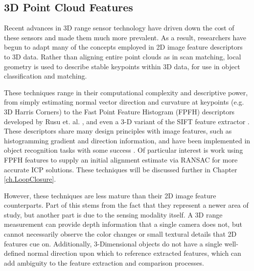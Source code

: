 \subsection{3D Point Cloud Features}

Recent advances in 3D range sensor technology have driven down the cost of these sensors and made them much more prevalent. As a result, researchers have begun to adapt many of the concepts employed in 2D image feature descriptors to 3D data. Rather than aligning entire point clouds as in scan matching, local geometry is used to describe stable keypoints within 3D data, for use in object classification and matching. 

These techniques range in their computational complexity and descriptive power, from simply estimating normal vector direction and curvature at keypoints (e.g. 3D Harris Corners) to the Fast Point Feature Histogram (FPFH) descriptors developed by Rusu et. al. \cite{Rusu2009}, and even a 3-D variant of the SIFT feature extractor \cite{Scovanner2007}. These descriptors share many design principles with image features, such as histogramming gradient and direction information, and have been implemented in object recognition tasks with some success \cite{Rusu2009}. Of particular interest is work using FPFH features to supply an initial alignment estimate via RANSAC for more accurate ICP solutions. These techniques will be discussed further in Chapter \ref{ch.LoopClosure}.

However, these techniques are less mature than their 2D image feature counterparts. Part of this stems from the fact that they represent a newer area of study, but another part is due to the sensing modality itself. A 3D range measurement  can provide depth information that a single camera does not, but cannot necessarily observe the color changes or small textural details that 2D features cue on. Additionally, 3-Dimensional objects do not have a single well-defined normal direction upon which to reference extracted features, which can add ambiguity to the feature extraction and comparison processes. 

